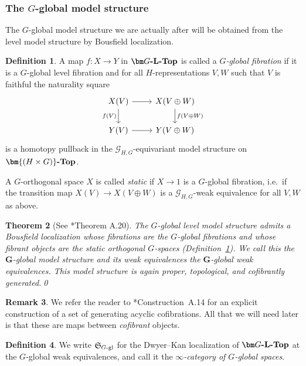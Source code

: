 \documentclass[reqno]{memo-l}
\theoremstyle{mythm}
\newtheorem{thm}{Theorem}[section]
\theoremstyle{definition}
\newtheorem{rk}[thm]{Remark}
\newtheorem{definition}[thm]{Definition}
\numberwithin{equation}{section}
\newcommand{\cat}[1]{\textbf{\textup{#1}}}
\newcommand{\myS}{{{\mathfrak S\kern-.4pt}}}
\begin{document}
\subsubsection{The $G$-global model structure} The $G$-global model structure we are actually after will be obtained from the level model structure by Bousfield localization.

\begin{definition}\label{def:g-gl-fib-orth-spc}
    A map $f\colon X\to Y$ in $\cat{$\bm G$-$\cat{L}$-Top}$ is called a \emph{$G$-global fibration} if it is a $G$-global level fibration and for all $H$-representations $V,W$ such that $V$ is faithful the naturality square
    \[
        \begin{tikzcd}
            X(V)\arrow[r]\arrow[d,"f(V)"'] & X(V\oplus W)\arrow[d,"f(V\oplus W)"]\\
            Y(V)\arrow[r] & Y(V\oplus W)
        \end{tikzcd}
    \]
    is a homotopy pullback in the $\mathcal G_{H,G}$-equivariant model structure on $\cat{$\bm{(H\times G)}$-Top}$.

    A $G$-orthogonal space $X$ is called \emph{static} if $X\to1$ is a $G$-global fibration, i.e.\ if the transition map $X(V)\to X(V\oplus W)$ is a $\mathcal G_{H,G}$-weak equivalence for all $V,W$ as above.
\end{definition}

\begin{thm}[See \cite{barrero2021}*{Theorem A.20}]
    The $G$-global level model structure admits a Bousfield localization whose fibrations are the $G$-global fibrations and whose fibrant objects are the static orthogonal $G$-spaces (Definition~\ref{def:g-gl-fib-orth-spc}). We call this the \emph{$\bm G$-global model structure} and its weak equivalences the \emph{$\bm G$-global weak equivalences}. This model structure is again proper, topological, and cofibrantly generated.\qed
\end{thm}

\begin{rk}\label{rk:generating-ayclic-between-cof}
    We refer the reader to \cite{barrero2021}*{Construction~A.14} for an explicit construction of a set of generating acyclic cofibrations. All that we will need later is that these are maps between \emph{cofibrant} objects.
\end{rk}

\begin{definition}
    We write $\myS_\text{$G$-gl}$ for the Dwyer--Kan localization of $\cat{$\bm G$-$\cat{L}$-Top}$ at the $G$-global weak equivalences, and call it the \emph{$\infty$-category of $G$-global spaces}.
\end{definition}
\end{document}
